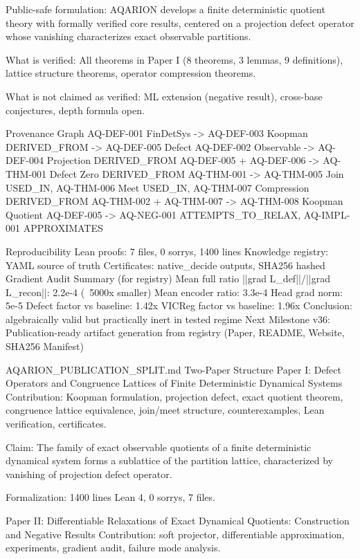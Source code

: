 {{{{{{{{{{{{{Public-safe formulation: AQARION develops a finite deterministic quotient theory with formally verified core results, centered on a projection defect operator whose vanishing characterizes exact observable partitions.

What is verified: All theorems in Paper I (8 theorems, 3 lemmas, 9 definitions), lattice structure theorems, operator compression theorems.

What is not claimed as verified: ML extension (negative result), cross-base conjectures, depth formula open.

Provenance Graph
AQ-DEF-001 FinDetSys -> AQ-DEF-003 Koopman DERIVED_FROM -> AQ-DEF-005 Defect
AQ-DEF-002 Observable -> AQ-DEF-004 Projection DERIVED_FROM
AQ-DEF-005 + AQ-DEF-006 -> AQ-THM-001 Defect Zero DERIVED_FROM
AQ-THM-001 -> AQ-THM-005 Join USED_IN, AQ-THM-006 Meet USED_IN, AQ-THM-007 Compression DERIVED_FROM
AQ-THM-002 + AQ-THM-007 -> AQ-THM-008 Koopman Quotient
AQ-DEF-005 -> AQ-NEG-001 ATTEMPTS_TO_RELAX, AQ-IMPL-001 APPROXIMATES

Reproducibility
Lean proofs: 7 files, 0 sorrys, 1400 lines
Knowledge registry: YAML source of truth
Certificates: native_decide outputs, SHA256 hashed
Gradient Audit Summary (for registry)
Mean full ratio ||grad L_def||/||grad L_recon||: 2.2e-4 (~5000x smaller)
Mean encoder ratio: 3.3e-4
Head grad norm: 5e-5
Defect factor vs baseline: 1.42x
VICReg factor vs baseline: 1.96x
Conclusion: algebraically valid but practically inert in tested regime
Next Milestone
v36: Publication-ready artifact generation from registry (Paper, README, Website, SHA256 Manifest)

AQARION_PUBLICATION_SPLIT.md
Two-Paper Structure
Paper I: Defect Operators and Congruence Lattices of Finite Deterministic Dynamical Systems
Contribution: Koopman formulation, projection defect, exact quotient theorem, congruence lattice equivalence, join/meet structure, counterexamples, Lean verification, certificates.

Claim: The family of exact observable quotients of a finite deterministic dynamical system forms a sublattice of the partition lattice, characterized by vanishing of projection defect operator.

Formalization: 1400 lines Lean 4, 0 sorrys, 7 files.

Paper II: Differentiable Relaxations of Exact Dynamical Quotients: Construction and Negative Results
Contribution: soft projector, differentiable approximation, experiments, gradient audit, failure mode analysis.

}}}}}}}}}}}}}

